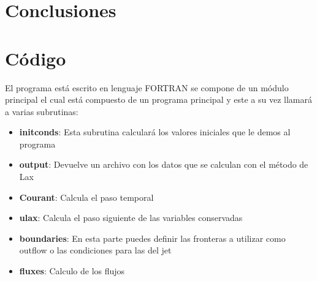 \documentclass[12pt,a4paper]{book}
\begin{document}
%
%
%
%
%
%


\chapter{Conclusiones}



\appendix
\chapter{Código}\label{aped.A}

El programa está escrito en lenguaje FORTRAN se compone de un módulo principal el cual está compuesto de un programa principal y este a su vez llamará a varias subrutinas:
\begin{itemize}
\item \textbf{initconds}: Esta subrutina calculará los valores iniciales que le demos al programa

\item \textbf{output}: Devuelve un archivo con los datos que se calculan con el método de Lax

\item \textbf{Courant}: Calcula el paso temporal

\item \textbf{ulax}: Calcula el paso siguiente de las variables conservadas

\item \textbf{boundaries}: En esta parte puedes definir las fronteras a utilizar como outflow o las condiciones para las del jet

\item \textbf{fluxes}: Calculo de los flujos
\end{itemize}
\end{document}
